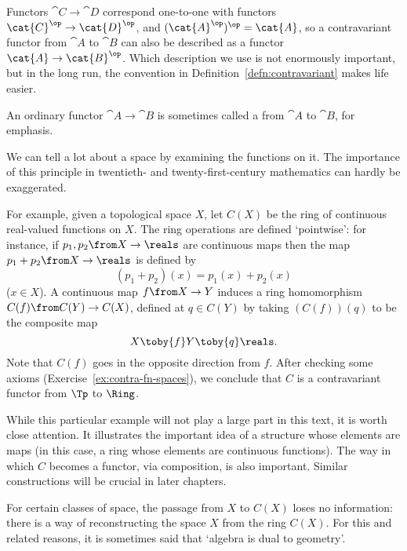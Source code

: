 Functors $\cat{C} \to \cat{D}$ correspond one-to-one with functors
$\cat{C}^\op \to \cat{D}^\op$, and $(\cat{A}^\op)^\op = \cat{A}$, so a
contravariant functor from $\cat{A}$ to $\cat{B}$ can also be described as
a functor $\cat{A} \to \cat{B}^\op$.  Which description we use is not
enormously important, but in the long run, the convention in
Definition~\ref{defn:contravariant} makes life easier.

An ordinary functor $\cat{A} \to \cat{B}$ is sometimes called a
 from $\cat{A}$ to $\cat{B}$, for emphasis.

\begin{example}
\label{eg:contra-fn-spaces}
%
%
%
We can tell a lot about a space by examining the functions on it.  The
importance of this principle in twentieth- and twenty-first-century
mathematics can hardly be exaggerated.

For example, given a topological space $X$, let $C(X)$%
%
%
be the ring of continuous real-valued functions on $X$.  The ring
operations are defined `pointwise':%
%
%
for instance, if $p_1, p_2\from X \to \reals$ are continuous maps then the
map $p_1 + p_2 \from X \to \reals$ is defined by
\[
(p_1 + p_2)(x) = p_1(x) + p_2(x)
\]
($x \in X$).  A continuous map $f\from X \to Y$ induces a ring homomorphism
$C(f)\from C(Y) \to C(X)$, defined at $q \in C(Y)$ by taking $(C(f))(q)$ to be
the composite map
\[
X \toby{f} Y \toby{q} \reals.
\]
Note that $C(f)$ goes in the opposite direction from $f$.  After checking
some axioms (Exercise~\ref{ex:contra-fn-spaces}), we conclude that $C$ is a
contravariant functor from $\Tp$ to $\Ring$.

While this particular example will not play a large part in this text, it
is worth close attention.  It illustrates the important idea of a
structure whose elements are maps (in this case, a ring whose elements are
continuous functions).  The way in which $C$ becomes a functor, via
composition, is also important.  Similar constructions will be crucial in
later chapters.

For certain classes of space, the passage from $X$ to $C(X)$ loses no
information: there is a way of reconstructing the space $X$ from the ring
$C(X)$.  For this and related reasons, it is sometimes said that `algebra
is dual%
%
%
to geometry'.
\end{example}

